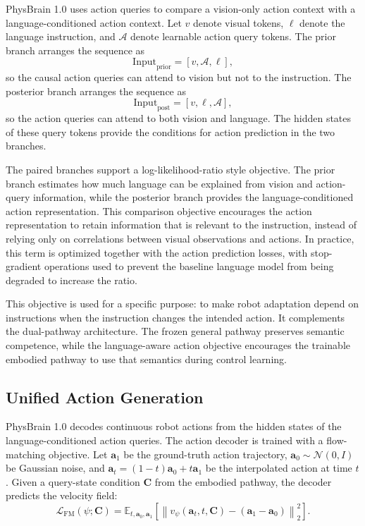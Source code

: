 \documentclass{llmxive}
\begin{document}
PhysBrain 1.0 uses action queries to compare a vision-only action context with a language-conditioned action context. Let $v$ denote visual tokens, $\ell$ denote the language instruction, and $\mathcal{A}$ denote learnable action query tokens. The prior branch arranges the sequence as
\begin{equation}
    \mathrm{Input}_{\mathrm{prior}} = [v, \mathcal{A}, \ell],
\end{equation}
so the causal action queries can attend to vision but not to the instruction. The posterior branch arranges the sequence as
\begin{equation}
    \mathrm{Input}_{\mathrm{post}} = [v, \ell, \mathcal{A}],
\end{equation}
so the action queries can attend to both vision and language. The hidden states of these query tokens provide the conditions for action prediction in the two branches.

The paired branches support a log-likelihood-ratio style objective. The prior branch estimates how much language can be explained from vision and action-query information, while the posterior branch provides the language-conditioned action representation. This comparison objective encourages the action representation to retain information that is relevant to the instruction, instead of relying only on correlations between visual observations and actions. In practice, this term is optimized together with the action prediction losses, with stop-gradient operations used to prevent the baseline language model from being degraded to increase the ratio.

This objective is used for a specific purpose: to make robot adaptation depend on instructions when the instruction changes the intended action. It complements the dual-pathway architecture. The frozen general pathway preserves semantic competence, while the language-aware action objective encourages the trainable embodied pathway to use that semantics during control learning.

\subsection{Unified Action Generation}

PhysBrain 1.0 decodes continuous robot actions from the hidden states of the language-conditioned action queries. The action decoder is trained with a flow-matching objective. Let $\mathbf{a}_1$ be the ground-truth action trajectory, $\mathbf{a}_0 \sim \mathcal{N}(0, I)$ be Gaussian noise, and $\mathbf{a}_t = (1-t)\mathbf{a}_0 + t\mathbf{a}_1$ be the interpolated action at time $t$. Given a query-state condition $\mathbf{C}$ from the embodied pathway, the decoder predicts the velocity field:
\begin{equation}
    \mathcal{L}_{\mathrm{FM}}(\psi; \mathbf{C}) =
    \mathbb{E}_{t,\mathbf{a}_0,\mathbf{a}_1}
    \left[
    \left\| v_\psi(\mathbf{a}_t, t, \mathbf{C}) - (\mathbf{a}_1 - \mathbf{a}_0) \right\|_2^2
    \right].
\end{equation}
\end{document}
